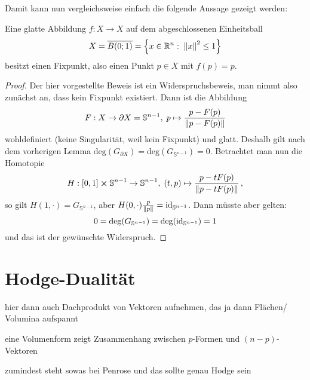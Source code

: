 \documentclass[../H_Analysis_main.tex]{subfiles}
\begin{document}
Damit kann nun vergleichsweise einfach die folgende Aussage gezeigt werden:
\begin{satz}
Eine glatte Abbildung $f: X \rightarrow X$ auf dem abgeschlossenen Einheitsball
\begin{equation*}
X = \overline{B(0; 1)} = \qty{x \in \mathbb{R}^n: \; \norm{x}^2 \leq 1}
\end{equation*}
besitzt einen Fixpunkt, also einen Punkt $p \in X$ mit $f(p) = p$.
\end{satz}
\begin{proof}
Der hier vorgestellte Beweis ist ein Widerspruchsbeweis, man nimmt also zunächst an, dass kein Fixpunkt existiert. Dann ist die Abbildung
\begin{equation*}
F: X \rightarrow \partial X = \mathbb{S}^{n - 1}, \; p \mapsto \frac{p - F(p)}{\norm{p - F(p)}}
\end{equation*}
wohldefiniert (keine Singularität, weil kein Fixpunkt) und glatt. Deshalb gilt nach dem vorherigen Lemma $\text{deg}(G_{\partial X}) = \text{deg}(G_{\mathbb{S}^{n - 1}}) = 0$. Betrachtet man nun die Homotopie
\begin{equation*}
H: [0, 1] \cross \mathbb{S}^{n - 1} \rightarrow \mathbb{S}^{n - 1}, \; (t, p) \mapsto \frac{p - t F(p)}{\norm{p - t F(p)}} \, ,
\end{equation*}
so gilt $H(1, \cdot) = G_{\mathbb{S}^{n - 1}}$, aber $H(0, \cdot) \frac{p}{\norm{p}} = \text{id}_{\mathbb{S}^{n - 1}}$. Dann müsste aber gelten:
\begin{equation*}
0 = \text{deg}\qty(G_{\mathbb{S}^{n - 1}}) = \text{deg}\qty(\text{id}_{\mathbb{S}^{n - 1}}) = 1
\end{equation*}
und das ist der gewünschte Widerspruch.
\end{proof}


\newpage


	\section{Hodge-Dualität}

hier dann auch Dachprodukt von Vektoren aufnehmen, das ja dann Flächen/ Volumina aufspannt

eine Volumenform zeigt Zusammenhang zwischen $p$-Formen und $(n - p)$-Vektoren

zumindest steht sowas bei Penrose und das sollte genau Hodge sein
\end{document}
